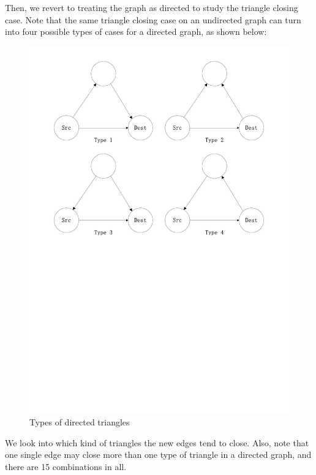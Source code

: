 \documentclass[10pt]{article}
\begin{document}
\begin{multicols}{2}
Then, we revert to treating the graph as directed to study the triangle closing case. Note that the same triangle closing case on an undirected graph can turn into four possible types of cases for a directed graph, as shown below: 
\begin{figure}[H]
    \centering
        \includegraphics[scale = 0.35, trim = 2cm 14cm 2cm 1cm]{./triangles.pdf}
    \caption{Types of directed triangles} \label{fig:triangles}
\end{figure}
We look into which kind of triangles the new edges tend to close. Also, note that one single edge may close more than one type of triangle in a directed graph, and there are 15 combinations in all. 
\begin{figure}[H]
    \centering

\end{figure}
\end{multicols}
\end{document}
